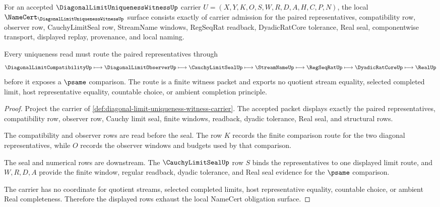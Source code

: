 \begin{theorem}
\label{thm:diagonal-limit-uniqueness-witness-namecert-obligations}
For an accepted $\DiagonalLimitUniquenessWitnessUp$ carrier $U=(X,Y,K,O,S,W,R,D,A,H,C,P,N)$, the local $\NameCert_{\DiagonalLimitUniquenessWitnessUp}$ surface consists exactly of carrier admission for the paired representatives, compatibility row, observer row, CauchyLimitSeal row, StreamName windows, RegSeqRat readback, DyadicRatCore tolerance, Real seal, componentwise transport, displayed replay, provenance, and local naming.

Every uniqueness read must route the paired representatives through
$$
\DiagonalLimitCompatibilityUp \longmapsto \DiagonalLimitObserverUp \longmapsto \CauchyLimitSealUp \longmapsto \StreamNameUp \longmapsto \RegSeqRatUp \longmapsto \DyadicRatCoreUp \longmapsto \RealUp
$$
before it exposes a $\psame$ comparison. The route is a finite witness packet and exports no quotient stream equality, selected completed limit, host representative equality, countable choice, or ambient completion principle.
\end{theorem}
\begin{proof}
Project the carrier of \autoref{def:diagonal-limit-uniqueness-witness-carrier}. The accepted packet displays exactly the paired representatives, compatibility row, observer row, Cauchy limit seal, finite windows, readback, dyadic tolerance, Real seal, and structural rows.

The compatibility and observer rows are read before the seal. The row $K$ records the finite comparison route for the two diagonal representatives, while $O$ records the observer windows and budgets used by that comparison.

The seal and numerical rows are downstream. The $\CauchyLimitSealUp$ row $S$ binds the representatives to one displayed limit route, and $W,R,D,A$ provide the finite window, regular readback, dyadic tolerance, and Real seal evidence for the $\psame$ comparison.

The carrier has no coordinate for quotient streams, selected completed limits, host representative equality, countable choice, or ambient Real completeness. Therefore the displayed rows exhaust the local NameCert obligation surface.
\end{proof}

